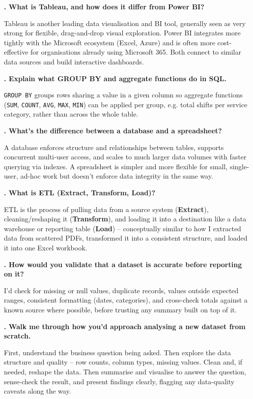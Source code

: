 \documentclass[10.5pt]{article}
\newcounter{qnum}
\newcommand{\qa}[2]{%
  \stepcounter{qnum}%
  \textbf{\theqnum. #1}\par
  #2\par
  \vspace{6pt}
}
\begin{document}
\qa{What is Tableau, and how does it differ from Power BI?}{Tableau is another leading data visualisation and BI tool, generally seen as very strong for flexible, drag-and-drop visual exploration. Power BI integrates more tightly with the Microsoft ecosystem (Excel, Azure) and is often more cost-effective for organisations already using Microsoft 365. Both connect to similar data sources and build interactive dashboards.}

\qa{Explain what GROUP BY and aggregate functions do in SQL.}{\texttt{GROUP BY} groups rows sharing a value in a given column so aggregate functions (\texttt{SUM}, \texttt{COUNT}, \texttt{AVG}, \texttt{MAX}, \texttt{MIN}) can be applied per group, e.g. total shifts per service category, rather than across the whole table.}

\qa{What's the difference between a database and a spreadsheet?}{A database enforces structure and relationships between tables, supports concurrent multi-user access, and scales to much larger data volumes with faster querying via indexes. A spreadsheet is simpler and more flexible for small, single-user, ad-hoc work but doesn't enforce data integrity in the same way.}

\qa{What is ETL (Extract, Transform, Load)?}{ETL is the process of pulling data from a source system (\textbf{Extract}), cleaning/reshaping it (\textbf{Transform}), and loading it into a destination like a data warehouse or reporting table (\textbf{Load}) -- conceptually similar to how I extracted data from scattered PDFs, transformed it into a consistent structure, and loaded it into one Excel workbook.}

\qa{How would you validate that a dataset is accurate before reporting on it?}{I'd check for missing or null values, duplicate records, values outside expected ranges, consistent formatting (dates, categories), and cross-check totals against a known source where possible, before trusting any summary built on top of it.}

\qa{Walk me through how you'd approach analysing a new dataset from scratch.}{First, understand the business question being asked. Then explore the data structure and quality -- row counts, column types, missing values. Clean and, if needed, reshape the data. Then summarise and visualise to answer the question, sense-check the result, and present findings clearly, flagging any data-quality caveats along the way.}
\end{document}
